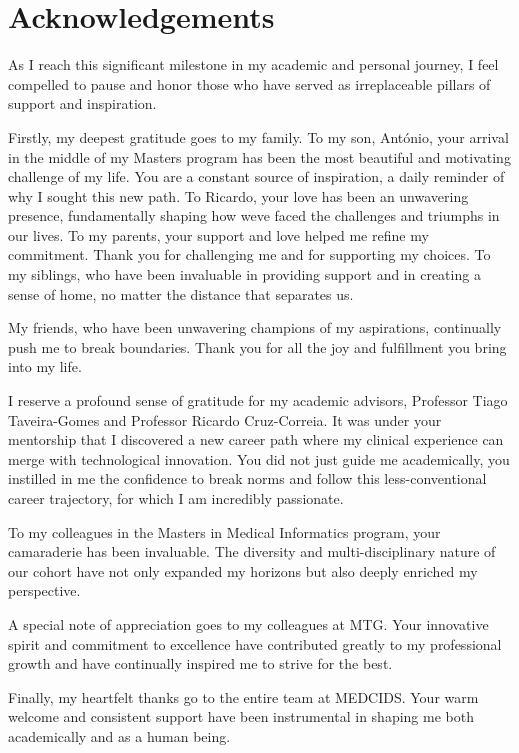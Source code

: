 \section{Acknowledgements}

As I reach this significant milestone in my academic and personal
journey, I feel compelled to pause and honor those who have served as
irreplaceable pillars of support and inspiration.

Firstly, my deepest gratitude goes to my family. To my son, António,
your arrival in the middle of my Master\textquotesingle s program has
been the most beautiful and motivating challenge of my life. You are a
constant source of inspiration, a daily reminder of why I sought this
new path. To Ricardo, your love has been an unwavering presence,
fundamentally shaping how we\textquotesingle ve faced the challenges and
triumphs in our lives. To my parents, your support and love helped me
refine my commitment. Thank you for challenging me and for supporting my
choices. To my siblings, who have been invaluable in providing support
and in creating a sense of home, no matter the distance that separates
us.

My friends, who have been unwavering champions of my aspirations,
continually push me to break boundaries. Thank you for all the joy and
fulfillment you bring into my life.

I reserve a profound sense of gratitude for my academic advisors,
Professor Tiago Taveira-Gomes and Professor Ricardo Cruz-Correia. It was
under your mentorship that I discovered a new career path where my
clinical experience can merge with technological innovation. You did not
just guide me academically, you instilled in me the confidence to break
norms and follow this less-conventional career trajectory, for which I
am incredibly passionate.

To my colleagues in the Master\textquotesingle s in Medical Informatics
program, your camaraderie has been invaluable. The diversity and
multi-disciplinary nature of our cohort have not only expanded my
horizons but also deeply enriched my perspective.

A special note of appreciation goes to my colleagues at MTG. Your
innovative spirit and commitment to excellence have contributed greatly
to my professional growth and have continually inspired me to strive for
the best.

Finally, my heartfelt thanks go to the entire team at MEDCIDS. Your warm
welcome and consistent support have been instrumental in shaping me both
academically and as a human being.
